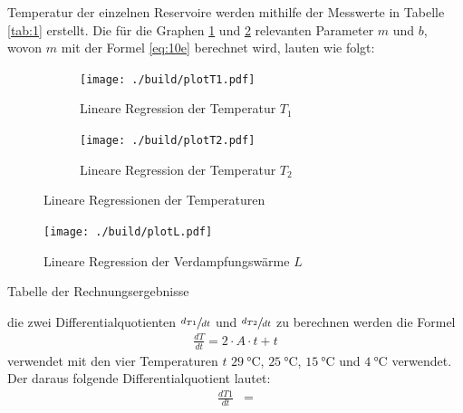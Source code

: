 \justifying Temperatur der einzelnen Reservoire werden mithilfe der Messwerte in Tabelle \ref{tab:1} erstellt. Die für
die Graphen \ref{fig:3a} und \ref{fig:3b} relevanten Parameter $m$ und $b$, wovon $m$ mit der Formel \eqref{eq:10e} berechnet wird, lauten 
wie folgt:
\newpage

\begin{figure}[H]
    \begin{subfigure}{0.495\linewidth}
        \centering
        \texttt{[image: ./build/plotT1.pdf]}
        \caption{Lineare Regression der Temperatur $T_1$}
        \label{fig:3a}
    \end{subfigure}
    \begin{subfigure}{0.495\linewidth}
        \centering
        \texttt{[image: ./build/plotT2.pdf]}
        \caption{Lineare Regression der Temperatur $T_2$}
        \label{fig:3b}
    \end{subfigure}
    \caption{Lineare Regressionen der Temperaturen}
    \label{fig:3}
\end{figure}

\begin{figure}[H]
    \centering
    \texttt{[image: ./build/plotL.pdf]}
    \caption{Lineare Regression der Verdampfungswärme $L$}
    \label{fig:4}
\end{figure}

\begin{table}[H]
    \centering
    
    \caption{Tabelle der Rechnungsergebnisse}
    \label{tab:2}
\end{table}



\justifying die zwei Differentialquotienten $\sfrac{d_{T1}}{dt}$ und $\sfrac{d_{T2}}{dt}$ zu berechnen werden die Formel
\begin{align}
    \frac{dT}{dt} = 2 \cdot A \cdot t + t \label{eq:12}
\end{align}
verwendet mit den vier Temperaturen $t$ $\SI{29}{\celsius}$, $\SI{25}{\celsius}$, $\SI{15}{\celsius}$ und $\SI{4}{\celsius}$ verwendet. 
Der daraus folgende Differentialquotient lautet:
\begin{align}
    \frac{dT1}{dt} &= \text{} \label{eq:13}
\end{align}

